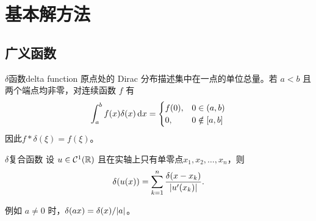 \chapter{基本解方法}
\section{广义函数}
\begin{definition}{$\delta$函数}{delta function}
	原点处的 Dirac 分布描述集中在一点的单位总量。若 $a < b$ 且两个端点均非零，对连续函数 $f$ 有
	\begin{equation}
		\label{eq:mmp-dirac-sifting}
		\int_a^bf(x)\delta(x)\mathop{}\!\mathrm{d} x =
		\begin{cases}
			f(0),&0 \in (a,b)\\
			0,&0 \notin [a,b]
		\end{cases}
	\end{equation}
	因此$f \ast \delta(\xi) = f(\xi)$。
\end{definition}
\begin{theorem}{$\delta$复合函数}{}
	设 $u \in \mathcal{C}^1(\mathbb{R})$ 且在实轴上只有单零点$x_1,x_2,\ldots,x_n$，则
	\begin{align}
		\delta(u(x)) = \sum_{k=1}^n\frac{\delta(x - x_k)}{\lvert u'(x_k)\rvert}.
	\end{align}
\end{theorem}
例如 $a \neq 0$ 时，$\delta(ax) = \delta(x)/\lvert a\rvert$。

